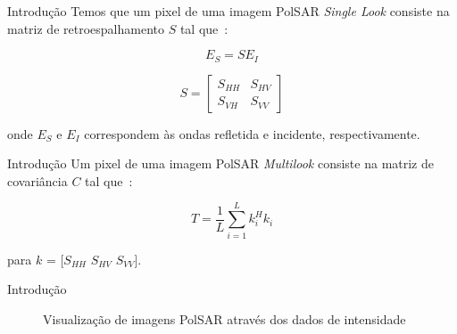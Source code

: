 \documentclass{beamer} %
\begin{document}
\begin{frame}{Introdução}
    Temos que um pixel de uma imagem PolSAR \textit{Single Look} consiste na matriz de retroespalhamento $S$ tal que~\cite{Pottier09}:
    
    \begin{equation}
        E_S = S E_I
    \end{equation}
    
    \begin{equation}
        S = 
        \begin{bmatrix}
            S_{HH} & S_{HV}\\
            S_{VH} & S_{VV}
        \end{bmatrix}
    \end{equation}
    
    onde $E_S$ e $E_I$ correspondem às ondas refletida e incidente, respectivamente.
\end{frame}

\begin{frame}{Introdução}
    Um pixel de uma imagem PolSAR \textit{Multilook} consiste na matriz de covariância $C$ tal que~\cite{Pottier09}:
    
    \begin{equation}
        T = \frac{1}{L} \sum_{i=1}^L k^H_i k_i 
    \end{equation}
    
    para $k$ = [$S_{HH}$ $S_{HV}$  $S_{VV}$].
\end{frame}

\begin{frame}{Introdução}
    
    \begin{figure}%
        \centering
        \qquad
        \caption{Visualização de imagens PolSAR através dos dados de intensidade}%
        \label{fig:example}%
    \end{figure}
    
\end{frame}
\end{document}
